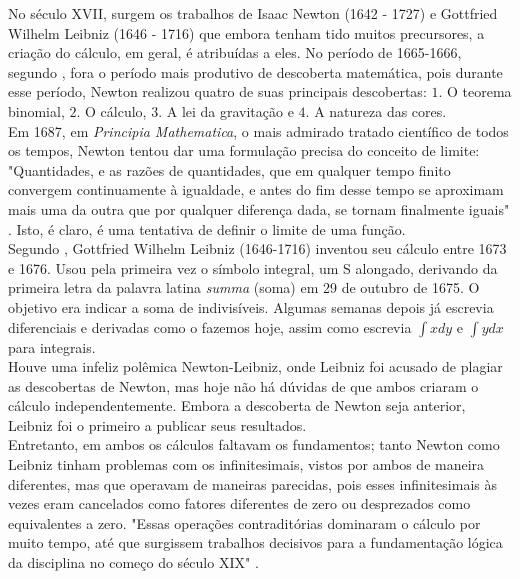  No século XVII, surgem
os trabalhos de Isaac Newton (1642 - 1727) e Gottfried Wilhelm
Leibniz (1646 - 1716) que embora tenham tido muitos precursores, a
criação do cálculo, em geral, é atribuídas a eles. No período de
1665-1666,  segundo , fora o período mais produtivo de
descoberta matemática, pois durante esse período, Newton realizou
quatro de suas principais descobertas: $1.$ O teorema binomial, $2.$ O
cálculo, $3.$ A lei da gravitação e $4.$ A natureza das cores.\\


 Em 1687,
em \textit{Principia Mathematica}, o mais admirado tratado científico de
todos os tempos, Newton tentou dar uma formulação precisa do
conceito de limite: "Quantidades, e as razões de quantidades, que em
qualquer tempo finito convergem continuamente à igualdade, e antes
do fim desse tempo se aproximam mais uma da outra que por qualquer
diferença dada, se tornam finalmente iguais" \cite[p.274]{boyer}. Isto, é claro, é uma
tentativa de definir o limite de uma função.\\


 Segundo ,
Gottfried Wilhelm Leibniz (1646-1716) inventou seu cálculo entre
1673 e 1676. Usou pela primeira vez o símbolo integral, um S
alongado, derivando da primeira letra da palavra latina \textit{summa} (soma)
em 29 de outubro de 1675. O objetivo era indicar a soma de
indivisíveis. Algumas semanas depois já escrevia diferenciais e
derivadas como o fazemos hoje, assim como escrevia $\displaystyle \int x dy$ e $\displaystyle \int y dx$
para integrais.\\


 Houve uma infeliz polêmica Newton-Leibniz, onde
Leibniz foi acusado de plagiar as descobertas de Newton, mas hoje
não há dúvidas de que ambos criaram o cálculo independentemente.
Embora a descoberta de Newton seja anterior, Leibniz foi o primeiro
a publicar seus resultados.\\


Entretanto, em ambos os cálculos faltavam os fundamentos; tanto
Newton como Leibniz tinham problemas com os infinitesimais, vistos
por ambos de maneira diferentes, mas que operavam de maneiras
parecidas, pois esses infinitesimais às vezes eram cancelados como
fatores diferentes de zero ou desprezados como equivalentes a zero. "Essas operações contraditórias dominaram o cálculo por muito tempo,
até que surgissem trabalhos decisivos para a fundamentação lógica da
disciplina no começo do século XIX" \cite{avila}.\\


